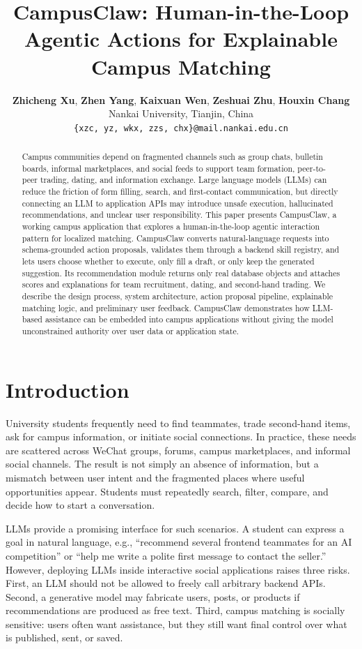 \documentclass[twocolumn]{article}
\title{\textbf{CampusClaw: Human-in-the-Loop Agentic Actions for Explainable Campus Matching}}
\author{
    \textbf{Zhicheng Xu}, \textbf{Zhen Yang}, \textbf{Kaixuan Wen}, \textbf{Zeshuai Zhu}, \textbf{Houxin Chang}\\
    Nankai University, Tianjin, China\\
    \texttt{\{xzc, yz, wkx, zzs, chx\}@mail.nankai.edu.cn}
}
\date{}
\begin{document}
\maketitle

\begin{abstract}
Campus communities depend on fragmented channels such as group chats, bulletin boards, informal marketplaces, and social feeds to support team formation, peer-to-peer trading, dating, and information exchange. Large language models (LLMs) can reduce the friction of form filling, search, and first-contact communication, but directly connecting an LLM to application APIs may introduce unsafe execution, hallucinated recommendations, and unclear user responsibility. This paper presents CampusClaw, a working campus application that explores a human-in-the-loop agentic interaction pattern for localized matching. CampusClaw converts natural-language requests into schema-grounded action proposals, validates them through a backend skill registry, and lets users choose whether to execute, only fill a draft, or only keep the generated suggestion. Its recommendation module returns only real database objects and attaches scores and explanations for team recruitment, dating, and second-hand trading. We describe the design process, system architecture, action proposal pipeline, explainable matching logic, and preliminary user feedback. CampusClaw demonstrates how LLM-based assistance can be embedded into campus applications without giving the model unconstrained authority over user data or application state.
\end{abstract}

\section{Introduction}
University students frequently need to find teammates, trade second-hand items, ask for campus information, or initiate social connections. In practice, these needs are scattered across WeChat groups, forums, campus marketplaces, and informal social channels. The result is not simply an absence of information, but a mismatch between user intent and the fragmented places where useful opportunities appear. Students must repeatedly search, filter, compare, and decide how to start a conversation.

LLMs provide a promising interface for such scenarios. A student can express a goal in natural language, e.g., ``recommend several frontend teammates for an AI competition'' or ``help me write a polite first message to contact the seller.'' However, deploying LLMs inside interactive social applications raises three risks. First, an LLM should not be allowed to freely call arbitrary backend APIs. Second, a generative model may fabricate users, posts, or products if recommendations are produced as free text. Third, campus matching is socially sensitive: users often want assistance, but they still want final control over what is published, sent, or saved.
\end{document}
